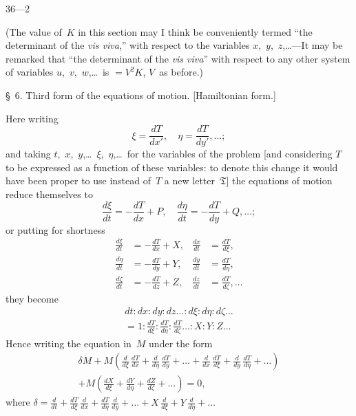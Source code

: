 \documentclass[11pt,a4paper]{article}
\newcommand{\papersection}[1]{\S\ #1.}
\begin{document}
\begin{center}
36---2
\end{center}

\newpage
(The value of~$K$ in this section may I think be conveniently termed ``the determinant of the \textit{vis viva},'' with respect to the variables $x$,~$y$,~$z$,\ldots---It may be remarked that ``the determinant of the \textit{vis viva}'' with respect to any other system of variables $u$,~$v$,~$w$,\ldots\ is $=V^2 K$, $V$~as before.)

\vspace{10pt}

\papersection{6} Third form of the equations of motion. [Hamiltonian form.]

Here writing
\[
\xi = \frac{dT}{dx'}, \quad \eta = \frac{dT}{dy'}, \ldots;
\]
and taking $t$,~$x$,~$y$,\ldots\ $\xi$,~$\eta$,\ldots\ for the variables of the problem [and considering $T$ to be expressed as a function of these variables: to denote this change it would have been proper to use instead of~$T$ a new letter~$\mathfrak{T}$] the equations of motion reduce themselves to
\[
\frac{d\xi}{dt} = -\frac{dT}{dx} + P, \quad \frac{d\eta}{dt} = -\frac{dT}{dy} + Q, \ldots;
\]
or putting for shortness
\begin{align*}
\frac{d\xi}{dt} &= -\frac{dT}{dx} + X, &
\frac{dx}{dt} &= \frac{dT}{d\xi},\\
\frac{d\eta}{dt} &= -\frac{dT}{dy} + Y, &
\frac{dy}{dt} &= \frac{dT}{d\eta},\\
\frac{d\zeta}{dt} &= -\frac{dT}{dz} + Z, &
\frac{dz}{dt} &= \frac{dT}{d\zeta},\ldots
\end{align*}
they become
\begin{multline*}
dt : dx : dy : dz\ldots : d\xi : d\eta : d\zeta\ldots \\
= 1 : \frac{dT}{d\xi} : \frac{dT}{d\eta} : \frac{dT}{d\zeta}\ldots : X : Y : Z\ldots
\end{multline*}
Hence writing the equation in~$M$ under the form
\begin{multline*}
\delta M + M\left(\frac{d}{d\xi}\,\frac{dT}{dx} + \frac{d}{d\eta}\,\frac{dT}{dy} + \ldots + \frac{d}{dx}\,\frac{dT}{d\xi} + \frac{d}{dy}\,\frac{dT}{d\eta} + \ldots\right) \\
+ M\left(\frac{dX}{d\xi} + \frac{dY}{d\eta} + \frac{dZ}{d\zeta} + \ldots\right) = 0,
\end{multline*}
where $\delta = \frac{d}{dt} + \frac{dT}{d\xi}\,\frac{d}{dx} + \frac{dT}{d\eta}\,\frac{d}{dy} + \ldots + X\,\frac{d}{d\xi} + Y\,\frac{d}{d\eta} + \ldots$
\end{document}
